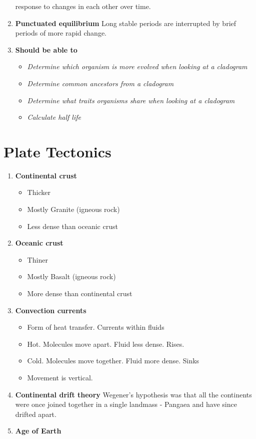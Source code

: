 \documentclass[9pt]{article}
\begin{document}
\begin{enumerate}
    response to changes in each other over time.
  \item {\bf Punctuated equilibrium} Long stable periods are
    interrupted by brief periods of more rapid change.
  \item {\bf Should be able to}
    \begin{itemize}
      \item {\em Determine which organism is more evolved when looking at a cladogram}
      \item {\em Determine common ancestors from a cladogram}
      \item {\em Determine what traits organisms share when looking at a cladogram}
      \item {\em Calculate half life}
    \end{itemize}
\end{enumerate}
\section*{Plate Tectonics}
\begin{enumerate}
  \item {\bf Continental crust}
    \begin{itemize}
      \item Thicker
      \item Mostly Granite (igneous rock)
      \item Less dense than oceanic crust
    \end{itemize}
  \item {\bf Oceanic crust}
    \begin{itemize}
      \item Thiner
      \item Mostly Basalt (igneous rock)
      \item More  dense than continental crust
    \end{itemize}
  \item {\bf Convection currents}
    \begin{itemize}
      \item Form of heat transfer. Currents within fluids
      \item Hot. Molecules move apart. Fluid less dense. Rises.
      \item Cold. Molecules move together. Fluid more dense. Sinks
      \item Movement is vertical.
    \end{itemize}
  \item {\bf Continental drift theory} Wegener's hypothesis was that
    all the continents were once joined together in a single landmass
    - Pangaea and have since drifted apart.
  \item {\bf Age of Earth}
\end{enumerate}
\end{document}
